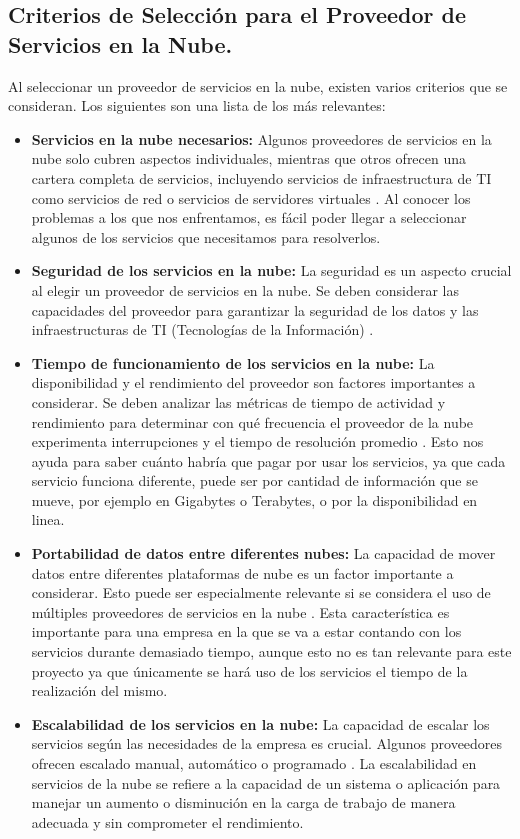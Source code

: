 \subsection{Criterios de Selección para el Proveedor de Servicios en la Nube.}
Al seleccionar un proveedor de servicios en la nube, existen varios criterios que se consideran. Los siguientes son una lista de los más relevantes:
 \begin{itemize}
     \item \textbf{Servicios en la nube necesarios:} Algunos proveedores de servicios en la nube solo cubren aspectos individuales, mientras que otros ofrecen una cartera completa de servicios, incluyendo servicios de infraestructura de TI como servicios de red o servicios de servidores virtuales \cite{proveedor1}. Al conocer los problemas a los que nos enfrentamos, es  fácil poder llegar a seleccionar algunos de los servicios que necesitamos para resolverlos.
     \item \textbf{Seguridad de los servicios en la nube: }La seguridad es un aspecto crucial al elegir un proveedor de servicios en la nube. Se deben considerar las capacidades del proveedor para garantizar la seguridad de los datos y las infraestructuras de TI (Tecnologías de la Información) \cite{proveedor2}.
     \item \textbf{Tiempo de funcionamiento de los servicios en la nube:} La disponibilidad y el rendimiento del proveedor son factores importantes a considerar. Se deben analizar las métricas de tiempo de actividad y rendimiento para determinar con qué frecuencia el proveedor de la nube experimenta interrupciones y el tiempo de resolución promedio \cite{proveedor2}. Esto nos ayuda para saber cuánto habría que pagar por usar los servicios, ya que cada servicio funciona diferente, puede ser por cantidad de información que se mueve, por ejemplo en Gigabytes o Terabytes, o por la disponibilidad en linea.
     \item \textbf{Portabilidad de datos entre diferentes nubes:} La capacidad de mover datos entre diferentes plataformas de nube es un factor importante a considerar. Esto puede ser especialmente relevante si se considera el uso de múltiples proveedores de servicios en la nube \cite{proveedor1}. Esta característica es importante para una empresa en la que se va a estar contando con los servicios durante demasiado tiempo, aunque esto no es tan relevante para este proyecto ya que únicamente se hará uso de los servicios el tiempo de la realización del mismo.
     \item \textbf{Escalabilidad de los servicios en la nube:} La capacidad de escalar los servicios según las necesidades de la empresa es crucial. Algunos proveedores ofrecen escalado manual, automático o programado \cite{proveedor3}. La escalabilidad en servicios de la nube se refiere a la capacidad de un sistema o aplicación para manejar un aumento o disminución en la carga de trabajo de manera adecuada y sin comprometer el rendimiento.

\end{itemize}
